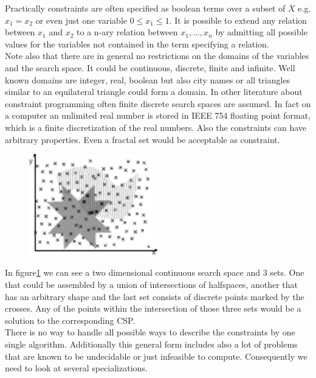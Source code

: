 Practically constraints are often specified as boolean terms over a subset of $X$ e.g. $x_1=x_2$ or even just one variable $0\leq x_1 \leq 1$. It is possible to extend any relation between $x_1$ and $x_2$ to a n-ary relation between $x_1,\dots,x_n$ by admitting all possible values for the variables not contained in the term specifying a relation.\\
Note also that there are in general no restrictions on the domains of the variables and the search space. It could be continuous, discrete, finite and infinite. Well known domains are integer, real, boolean but also city names or all triangles similar to an equilateral triangle could form a domain. In other literature about constraint programming often finite discrete search spaces are assumed. In fact on a computer an unlimited real number is stored in IEEE 754 floating point format, which is a finite discretization of the real numbers. Also the constraints can have arbitrary properties. Even a fractal set would be acceptable as constraint.\\
\begin{figure}
\label{fig:CSPExample}
\includegraphics[width=0.5\textwidth]{./pics/SetIntersection.pdf}
\end{figure}
In figure\ref{fig:CSPExample} we can see a two dimensional continuous search space and 3 sets. One that could be assembled by a union of intersections of halfspaces, another that has an arbitrary shape and the last set consists of discrete points marked by the crosses. Any of the points within the intersection of those three sets would be a solution to the corresponding CSP.
\\There is no way to handle all possible ways to describe the constraints by one single algorithm. Additionally this general form includes also a lot of problems that are known to be undecidable or just infeasible to compute. Consequently we need to look at several specializations.

